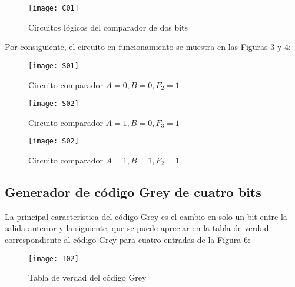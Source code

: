 \documentclass[a4paper,12pt]{article}
\begin{document}
\begin{figure}[ht!]
	\centering

	\texttt{[image: C01]}

	\caption{Circuitos lógicos del comparador de dos bits}
\end{figure}


Por consiguiente, el circuito en funcionamiento se muestra en las Figuras 3 y 4:\par

\begin{figure}[ht!]
	\centering

	\texttt{[image: S01]}

	\caption{Circuito comparador $A = 0, B = 0, F_2 = 1$}
\end{figure}

\begin{figure}[ht!]
	\centering

	\texttt{[image: S02]}

	\caption{Circuito comparador $A = 1, B = 0, F_3 = 1$}
\end{figure}

\begin{figure}[ht!]
	\centering

	\texttt{[image: S02]}

	\caption{Circuito comparador $A = 1, B = 1, F_2 = 1$}
\end{figure}

\newpage



\subsection{Generador de código Grey de cuatro bits}

\vspace{1cm}


La principal característica del código Grey es el cambio en solo un bit entre la salida anterior y la siguiente, que se puede apreciar en la tabla de verdad correspondiente al código Grey para cuatro entradas de la Figura 6:\par

\vspace{1cm}

\begin{figure}[ht!]
	\centering

	\texttt{[image: T02]}

	\caption{Tabla de verdad del código Grey}
\end{figure}
\end{document}
